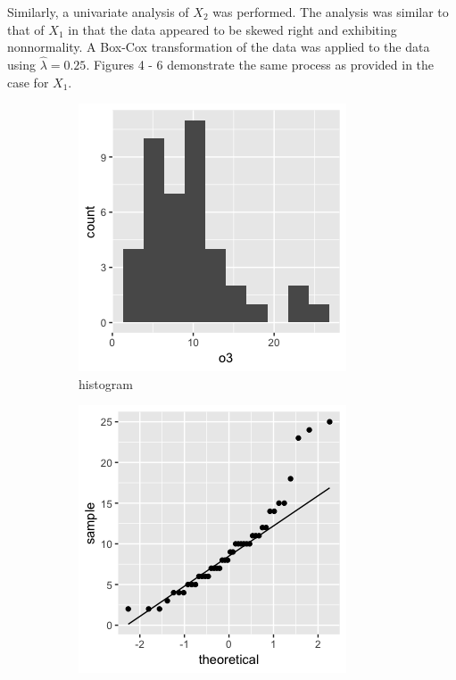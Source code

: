 Similarly, a univariate analysis of $X_2$ was performed. The analysis was similar to that of $X_1$ in that the data appeared to be skewed right and exhibiting nonnormality. A Box-Cox transformation of the data was applied to the data using $\hat{\lambda} = 0.25$. Figures 4 - 6 demonstrate the same process as provided in the case for $X_1$.
\begin{figure}[H]
\begin{subfigure}{.33\textwidth}
  \centering
  \includegraphics[width=.8\linewidth]{plot_4_29_X2hist.png}
  \caption{histogram}
  \label{fig:sfig1}
\end{subfigure}%
\begin{subfigure}{.33\textwidth}
  \centering
  \includegraphics[width=.8\linewidth]{plot_4_29_X2qq.png}

\end{subfigure}
\end{figure}
